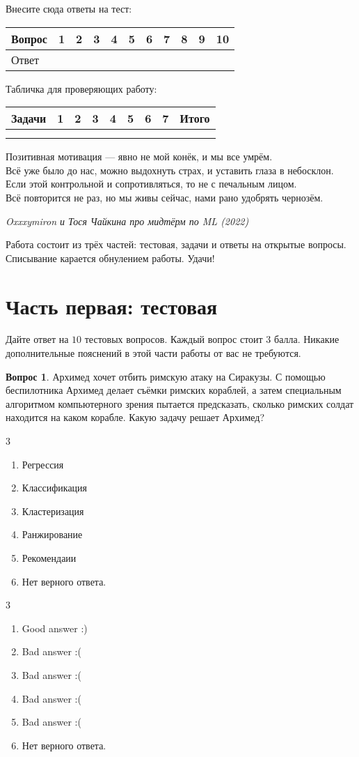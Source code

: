 \documentclass[12pt]{article}
\def \putyourname{\fbox{
    \begin{minipage}{42em}
      Фамилия, имя, номер группы:\vspace*{3ex}\par
      \noindent\dotfill\vspace{2mm}
    \end{minipage}
  }
}
\def \checktable{

  \vspace{5pt}
  Табличка для проверяющих работу:

\vspace{5pt}

  \begin{tabular}{|m{2cm}|m{1cm}|m{1cm}|m{1cm}|m{1cm}|m{1cm}|m{1cm}|m{1cm}|m{2cm}|}
\toprule
    Задачи & 1 & 2 & 3 & 4 & 5 & 6 & 7 & Итого \\
\midrule
    &  &  & & & & & & \\
    &  &  & & & & & & \\
 \bottomrule
\end{tabular}
}
\def \testtable{

\vspace{5pt}
  Внесите сюда ответы на тест:

\vspace{5pt}

\begin{tabular}{|m{2cm}|m{0.6cm}|m{0.6cm}|m{0.6cm}|m{0.6cm}|m{0.6cm}|m{0.6cm}|m{0.6cm}|m{0.6cm}|m{0.6cm}|m{0.6cm}|}
\toprule
    Вопрос & 1 &  2 & 3 & 4 & 5 & 6 & 7 & 8 & 9 & 10 \\
\midrule
    Ответ &  &  & & & & & & & & \\
 \bottomrule
\end{tabular}
}
\newenvironment{answerlist}[1][3]{
\begin{multicols}{#1}

\begin{enumerate}[label=\fbox{\emph{\Alph*}},ref=\emph{\alph*}]
}
{
\item Нет верного ответа.
\end{enumerate}
\end{multicols}
}
\theoremstyle{definition}
\newtheorem{question}{Вопрос}
\begin{document}
\putyourname

\testtable

\checktable

\epigraph{Позитивная мотивация — явно не мой конёк, и мы все умрём. \\ Всё уже было до нас, можно выдохнуть страх, и уставить глаза в небосклон. \\ Если этой контрольной и сопротивляться, то не с печальным лицом. \\ Всё повторится не раз, но мы живы сейчас, нами рано удобрять чернозём.}{\textit{Oxxxymiron и Тося Чайкина про мидтёрм по ML (2022)}}


Работа состоит из трёх частей: тестовая, задачи и ответы на открытые вопросы. Списывание карается обнулением работы. Удачи!


\section*{Часть первая: тестовая} 

Дайте ответ на $10$ тестовых вопросов. Каждый вопрос стоит $3$ балла. Никакие дополнительные пояснений в этой части работы от вас не требуются.

\begin{question}
Архимед хочет отбить римскую атаку на Сиракузы. С помощью беспилотника Архимед делает съёмки римских кораблей, а затем специальным алгоритмом компьютерного зрения пытается предсказать, сколько римских солдат находится на каком корабле. Какую задачу решает Архимед? 
\begin{answerlist}
   \item  Регрессия
   \item  Классификация
   \item  Кластеризация
   \item  Ранжирование
   \item  Рекомендаии
\end{answerlist}
\end{question}

\begin{solution}
\begin{answerlist}
  \item Good answer :)
  \item Bad answer :(
  \item Bad answer :(
  \item Bad answer :(
  \item Bad answer :(
\end{answerlist}
\end{solution}
\end{document}
